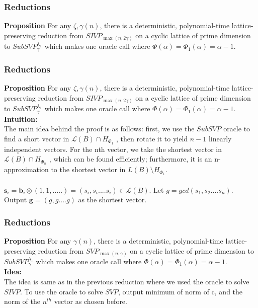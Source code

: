 \documentclass{beamer}
\newcommand{\Latt}{\mathcal{L}}
\begin{document}
\begin{frame}
	\frametitle{Reductions}
	\textbf{Proposition} For any $\zeta, \gamma(n)$, there is a deterministic, polynomial-time lattice-preserving
	reduction from $SIVP_{\max(n,2\gamma)}$ on a cyclic lattice of prime dimension to $SubSVP_\gamma^{\lambda_1}$ which makes one oracle call where $\Phi(\alpha) = \Phi_1(\alpha) = \alpha - 1$.
\end{frame}
\begin{frame}
	\frametitle{Reductions}
	\textbf{Proposition} For any $\zeta, \gamma(n)$, there is a deterministic, polynomial-time lattice-preserving
	reduction from $SIVP_{\max(n,2\gamma)}$ on a cyclic lattice of prime dimension to $SubSVP_\gamma^{\lambda_1}$ which makes one oracle call where $\Phi(\alpha) = \Phi_1(\alpha) = \alpha - 1$.
	\\
	\textbf{Intuition:}
	\\
	The main idea behind the proof is as follows: first, we use the $SubSVP$ oracle to find a
	short vector in $\Latt(B) \cap H_{\Phi_1}$ , then rotate it to yield $n - 1$ linearly independent vectors. For the nth
	vector, we take the shortest vector in $\Latt(B) \cap H_{\Phi_n}$ , which can be found efficiently; furthermore, it
	is an n-approximation to the shortest vector in $L(B) \setminus H_{\Phi_1}.$
	\\~\\
	$\mathbf{s}_i = \mathbf{b}_i \otimes (1,1,.....) = (s_i,s_i....s_i) \in \Latt(B)$. Let $g = gcd(s_1,s_2....s_n)$. Output $\mathbf{g} = (g,g....g)$ as the shortest vector.
\end{frame}
\begin{frame}
	\frametitle{Reductions}
	\textbf{Proposition} For any $\gamma(n)$, there is a deterministic, polynomial-time lattice-preserving
	reduction from $SVP_{\max(n,\gamma)}$ on a cyclic lattice of prime dimension to $SubSVP_\gamma^{\lambda_1}$ which makes one oracle call where $\Phi(\alpha) = \Phi_1(\alpha) = \alpha - 1$.
	\\
	\textbf{Idea:}
	\\
	The idea is same as in the previous reduction where we used the oracle to solve $SIVP$. To use the oracle to solve $SVP$, output minimum of norm of c, and the norm of the $n^{th}$ vector as chosen before.
\end{frame}
\end{document}
